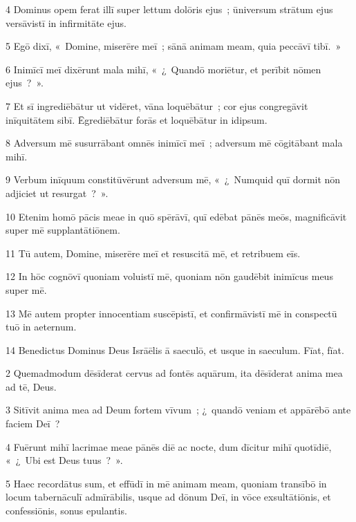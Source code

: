\psalmVerse
  {\phantom{00}4}
  {Dominus opem ferat illī super lettum dolōris ejus~; ūniversum strātum ejus versāvistī in infirmitāte ejus.}


\psalmVerse
  {\phantom{00}5}
  {Egō dixī, «~Domine, miserēre meī~; sānā animam meam, quia peccāvī tibī.~»}


\psalmVerse
  {\phantom{00}6}
  {Inimīcī meī dixērunt mala mihī, «~¿~Quandō moriētur, et perībit nōmen ejus~?~».}


\psalmVerse
  {\phantom{00}7}
  {Et sī ingrediēbātur ut vidēret, vāna loquēbātur~; cor ejus congregāvit inīquitātem sibī. Ēgrediēbātur forās et loquēbātur in idipsum.}


\psalmVerse
  {\phantom{00}8}
  {Adversum mē susurrābant omnēs inimīcī meī~; adversum mē cōgitābant mala mihī.}


\psalmVerse
  {\phantom{00}9}
  {Verbum inīquum constitūvērunt adversum mē, «~¿~Numquid quī dormit nōn adjiciet ut resurgat~?~».}


\psalmVerse
  {\phantom{0}10}
  {Etenim homō pācis meae in quō spērāvī, quī edēbat pānēs meōs, magnificāvit super mē supplantātiōnem.}


\psalmVerse
  {\phantom{0}11}
  {Tū autem, Domine, miserēre meī et resuscitā mē, et retribuem eīs.}


\psalmVerse
  {\phantom{0}12}
  {In hōc cognōvī quoniam voluistī mē, quoniam nōn gaudēbit inimīcus meus super mē.}


\psalmVerse
  {\phantom{0}13}
  {Mē autem propter innocentiam suscēpistī, et confirmāvistī mē in conspectū tuō in aeternum.}


\psalmVerse
  {\phantom{0}14}
  {Benedictus Dominus Deus Isrāēlis ā saeculō, et usque in saeculum. Fīat, fīat.}



\psalmVerse
  {\phantom{00}2}
  {Quemadmodum dēsīderat cervus ad fontēs aquārum, ita dēsīderat anima mea ad tē, Deus.}


\psalmVerse
  {\phantom{00}3}
  {Sitīvit anima mea ad Deum fortem vīvum~; ¿~quandō veniam et appārēbō ante faciem Deī~?}


\psalmVerse
  {\phantom{00}4}
  {Fuērunt mihī lacrimae meae pānēs diē ac nocte, dum dīcitur mihī quotīdiē, «~¿~Ubi est Deus tuus~?~».}


\psalmVerse
  {\phantom{00}5}
  {Haec recordātus sum, et effūdī in mē animam meam, quoniam transībō in locum tabernāculī admīrābilis, usque ad dōnum Deī, in vōce exsultātiōnis, et confessiōnis, sonus epulantis.}


